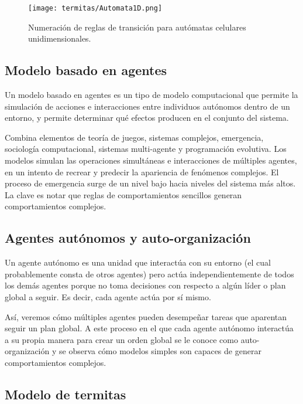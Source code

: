 \begin{figure}
  \centering
  \texttt{[image: termitas/Automata1D.png]}
  \caption{Numeración de reglas de transición para autómatas celulares unidimensionales.}
  \label{fig:numtrans}
\end{figure}

\subsection{Modelo basado en agentes}
Un modelo basado en agentes es un tipo de modelo computacional que permite la simulación de acciones e interacciones entre individuos autónomos dentro de un entorno, y permite determinar qué efectos producen en el conjunto del sistema.\par

Combina elementos de teoría de juegos, sistemas complejos, emergencia, sociología computacional, sistemas multi-agente y programación evolutiva.
Los modelos simulan las operaciones simultáneas e interacciones de múltiples agentes, en un intento de recrear y predecir la apariencia de fenómenos complejos. El proceso de emergencia surge de un nivel bajo hacia niveles del sistema más altos. La clave es notar que reglas de comportamientos sencillos generan comportamientos complejos.\par


\subsection{Agentes aut\'onomos y auto-organizaci\'on}

Un agente autónomo es una unidad que interactúa con su entorno (el cual probablemente consta de otros agentes) pero actúa independientemente de todos los demás agentes porque no toma decisiones con respecto a algún líder o plan global a seguir. Es decir, cada agente actúa por sí mismo.\par

Así, veremos cómo múltiples agentes pueden desempeñar tareas que aparentan seguir un plan global. A este proceso en el que cada agente autónomo interactúa a su propia manera para crear un orden global se le conoce como auto-organización y se observa cómo modelos simples son capaces de generar comportamientos complejos.\par


\subsection{Modelo de termitas}

